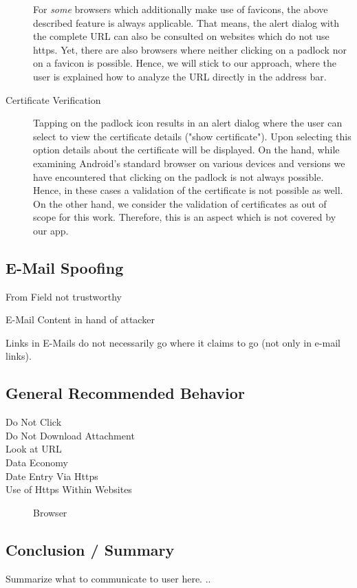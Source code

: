 \begin{description}
For \textit{some} browsers which additionally make use of favicons, the above described feature is always applicable.
That means, the alert dialog with the complete URL can also be consulted on websites which do not use https.
Yet, there are also browsers where neither clicking on a padlock nor on a favicon is possible.
Hence, we will stick to our approach, where the user is explained how to analyze the URL directly in the address bar.
		\item[Certificate Verification]Tapping on the padlock icon results in an alert dialog where the user can select to view the certificate details ("show certificate").
Upon selecting this option details about the certificate will be displayed.
On the hand, while examining Android's standard browser on various devices and versions we have encountered that clicking on the padlock is not always possible. 
Hence, in these cases a validation of the certificate is not possible as well.
On the other hand, we consider the validation of certificates as out of scope for this work.
Therefore, this is an aspect which is not covered by our app.

\end{description}

\subsection{E-Mail Spoofing}

\begin{description}
	\item{From Field} not trustworthy
	\item{E-Mail Content} in hand of attacker
	\item{Links in E-Mails} do not necessarily go where it claims to go (not only in e-mail links).
\end{description}

\subsection{General Recommended Behavior}
\begin{description}
	\item[Do Not Click]
	\item[Do Not Download Attachment]
	\item[Look at URL]
	\item[Data Economy]
	\item[Date Entry Via Https]
	\item[Use of Https Within Websites] Browser
\end{description}

\subsection{Conclusion / Summary}

Summarize what to communicate to user here.
..

